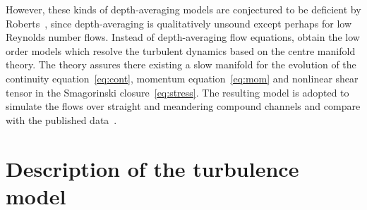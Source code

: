 \documentclass[twocolumn]{afmc_art}
\begin{document}
However, these kinds of depth-averaging models are conjectured to be deficient by Roberts~\cite{Roberts1996}, since depth-averaging is qualitatively unsound except perhaps for low Reynolds number flows.
Instead of depth-averaging flow equations, obtain the low order models which resolve the turbulent dynamics based on the centre manifold theory. 
The theory assures there existing a slow manifold for the evolution of the continuity equation~\eqref{eq:cont}, momentum equation~\eqref{eq:mom} and nonlinear shear tensor in the Smagorinski closure~\eqref{eq:stress}.
The resulting model is adopted to simulate the flows over straight and meandering compound channels and compare with the published data~\cite[e.g.]{Bousmar2002,Liu2009}.


\section{Description of the turbulence model}
\end{document}
